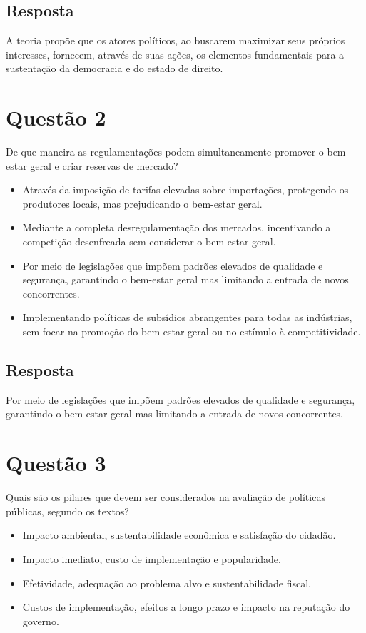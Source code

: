 \documentclass[
   article,       
   12pt,          
   oneside,       
   a4paper,       
   english,       
   brazil,        
   sumario=tradicional
   ]{abntex2}
\begin{document}
\subsection{Resposta}
A teoria propõe que os atores políticos, ao buscarem maximizar seus próprios interesses, fornecem, através de suas ações, os elementos fundamentais para a sustentação da democracia e do estado de direito.

\section{Questão 2}
De que maneira as regulamentações podem simultaneamente promover o bem-estar geral e criar reservas de mercado?

\begin{itemize}
  \item Através da imposição de tarifas elevadas sobre importações, protegendo os produtores locais, mas prejudicando o bem-estar geral.
  \item Mediante a completa desregulamentação dos mercados, incentivando a competição desenfreada sem considerar o bem-estar geral.
  \item Por meio de legislações que impõem padrões elevados de qualidade e segurança, garantindo o bem-estar geral mas limitando a entrada de novos concorrentes.
  \item Implementando políticas de subsídios abrangentes para todas as indústrias, sem focar na promoção do bem-estar geral ou no estímulo à competitividade.
\end{itemize}

\subsection{Resposta}
Por meio de legislações que impõem padrões elevados de qualidade e segurança, garantindo o bem-estar geral mas limitando a entrada de novos concorrentes.

\section{Questão 3}
Quais são os pilares que devem ser considerados na avaliação de políticas públicas, segundo os textos?

\begin{itemize}
  \item Impacto ambiental, sustentabilidade econômica e satisfação do cidadão.
  \item Impacto imediato, custo de implementação e popularidade.
  \item Efetividade, adequação ao problema alvo e sustentabilidade fiscal.
  \item Custos de implementação, efeitos a longo prazo e impacto na reputação do governo.
\end{itemize}
\end{document}
